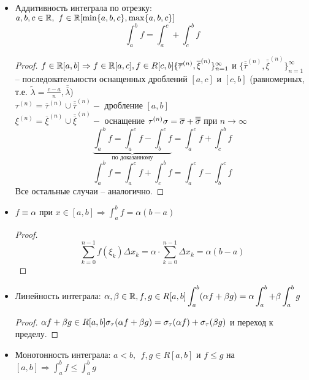 \begin{itemize}
	\item Аддитивность интеграла по отрезку:\\ $a, b, c \in \mathbb{R}, \ f \in \mathbb{R} [\min\{a, b, c\}, \max \{a, b, c\}]$
	\[\int_{a}^{b} f = \int_{a}^{c} + \int_{c}^{b} f\]

	\begin{proof}
		$f\in \mathbb{R}[a,b] \Rightarrow f \in \mathbb{R}[a,c], f \in R[c,b] \{\overline{\tau}^{(n)}, \overline{\xi}^{(n)}\}^{\infty}_{n=1}$ и $\{\overline{\overline{\tau}}^{(n)}, \overline{\overline{\xi}}^{(n)}\}^{\infty}_{n=1}$ --
		последовательности оснащенных дроблений $[a,c]$ и $[c,b]$  (равномерных, т.е. $\widetilde{\lambda} = \frac{c-a}{n}, \overline{\overline{\lambda}}$)\\
		$\tau^{(n)} = \overline{\tau}^{(n)} \cup \overline{\overline{\tau}}^{(n)} -$ дробление $[a,b]$\\
		$\xi^{(n)} = \overline{\xi}^{(n)} \cup \overline{\overline{\xi}}^{(n)} -$ оснащение $\tau^{(n)}\\
		\sigma = \overline{\sigma} + \overline{\overline{\sigma}}$ при $n \to \infty$\\
		\[\underbrace{\int_{a}^{b} f = \int_{a}^{c} f - \int_{b}^{c} f}_{\text{по доказанному}}  = \int_{a}^{c} f + \int_{c}^{b} f\]
		\[ \int_{a}^{b} f = \int_{a}^{c} f + \int_{c}^{b} f = \int_{a}^{c} f - \int_{b}^{c} f\]
		Все остальные случаи -- аналогично.
	\end{proof}

	\item $f \equiv \alpha$ при $\displaystyle x \in [a,b] \Rightarrow \int_{a}^{b} f = \alpha(b-a)$
	
	\begin{proof}
		\[\sum_{k=0}^{n-1} f(\xi_k) \Delta x_k = \alpha \cdot \sum_{k=0}^{n-1} \Delta x_k = \alpha (b-a)\]
	\end{proof}

	\item Линейность интеграла: $\alpha, \beta \in \mathbb{R}, f, g \in R[a,b]\\
	\displaystyle \int_{a}^{b} (\alpha f + \beta g) = \alpha \int_{a}^{b} + \beta \int_{a}^{b} g$

	\begin{proof}
		$\alpha f + \beta g \in R [a,b]\\
		\sigma_{\tau}(\alpha f + \beta g) = \sigma_{\tau}(\alpha f) + \sigma_{\tau} (\beta g)$ и переход к пределу.
	\end{proof}

	\item Монотонность интеграла: $a < b, \ \ f, g \in R[a,b]$ и $f \leqslant g$ на $\displaystyle [a,b] \Rightarrow \int_{a}^{b} f \leqslant \int_{a}^{b} g$


\end{itemize}
